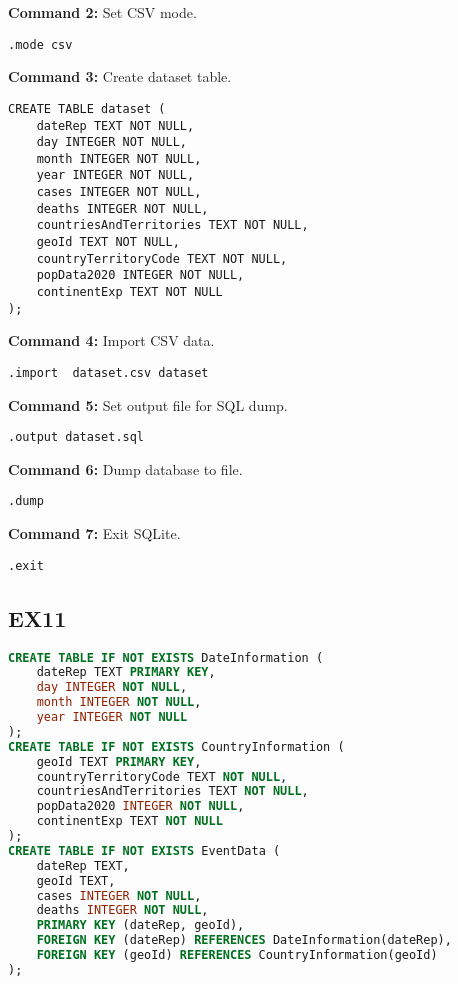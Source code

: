 \documentclass[10pt]{article}
\begin{document}
\textbf{Command 2:} Set CSV mode.
\begin{verbatim}
.mode csv
\end{verbatim}

\textbf{Command 3:} Create dataset table.
\begin{verbatim}
CREATE TABLE dataset (
    dateRep TEXT NOT NULL,
    day INTEGER NOT NULL,
    month INTEGER NOT NULL,
    year INTEGER NOT NULL,
    cases INTEGER NOT NULL,
    deaths INTEGER NOT NULL,
    countriesAndTerritories TEXT NOT NULL,
    geoId TEXT NOT NULL,
    countryTerritoryCode TEXT NOT NULL,
    popData2020 INTEGER NOT NULL,
    continentExp TEXT NOT NULL
);
\end{verbatim}

\textbf{Command 4:} Import CSV data.
\begin{verbatim}
.import  dataset.csv dataset
\end{verbatim}

\textbf{Command 5:} Set output file for SQL dump.
\begin{verbatim}
.output dataset.sql
\end{verbatim}

\textbf{Command 6:} Dump database to file.
\begin{verbatim}
.dump
\end{verbatim}

\textbf{Command 7:} Exit SQLite.
\begin{verbatim}
.exit
\end{verbatim}


\subsection{EX11}
\begin{lstlisting}[language=SQL]
CREATE TABLE IF NOT EXISTS DateInformation (
    dateRep TEXT PRIMARY KEY,
    day INTEGER NOT NULL,
    month INTEGER NOT NULL,
    year INTEGER NOT NULL
);
CREATE TABLE IF NOT EXISTS CountryInformation (
    geoId TEXT PRIMARY KEY,
    countryTerritoryCode TEXT NOT NULL,
    countriesAndTerritories TEXT NOT NULL,
    popData2020 INTEGER NOT NULL,
    continentExp TEXT NOT NULL
);
CREATE TABLE IF NOT EXISTS EventData (
    dateRep TEXT,
    geoId TEXT,
    cases INTEGER NOT NULL,
    deaths INTEGER NOT NULL,
    PRIMARY KEY (dateRep, geoId),
    FOREIGN KEY (dateRep) REFERENCES DateInformation(dateRep),
    FOREIGN KEY (geoId) REFERENCES CountryInformation(geoId)
);

\end{lstlisting}
\end{document}
